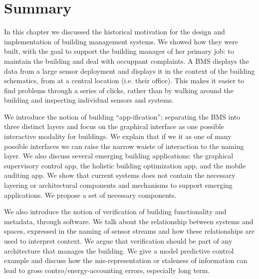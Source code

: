 
\section{Summary}


In this chapter we discussed the historical motivation for the design and implementation of building management systems.
We showed how they were built, with the goal to support the building manager of her primary job: to maintain the 
building and deal with occuppant complaints.  A BMS displays the data from a large sensor deployment and displays it in the
context of the building schematics, from at a central location (i.e. their office).  This makes it easier to  
find problems through a series of clicks, rather than by  walking around the building and inspecting
individual sensors and systems.

We introduce the notion of building ``app-ification''; separating the BMS into three distinct layers
and focus on the graphical interface as one possible interactive modality for buildings.  We explain that if we
it as one of many possible interfaces we can raise the narrow waiste of interaction to the naming layer.  We also discuss
several emerging building applications: the graphical supervisory control app, the holistic building optimization app,
and the mobile auditing app.  We show that current systems does not contain the necessary layering or architectural components
and mechanisms to support emerging applications.  We propose a set of necessary components.

We also introduce the notion of verification of building functionality and metadata, through software.  We talk about the
relationship between systems and spaces, expressed in the naming of sensor streams and how these relationships are used
to interpret context.  We argue that verification should be part of any
architecture that manages the building.  We give a model predictive control example and discuss how the mis-representation or
staleness of information can lead to gross contro/energy-accounting errors, especially long term.

